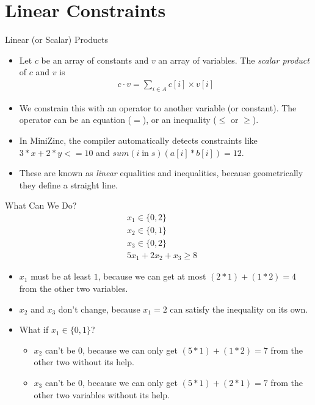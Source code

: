 \documentclass[aspectratio=169,compress,10pt]{beamer}
\begin{document}
\section{Linear Constraints}

\begin{frame}{Linear (or Scalar) Products}
    \begin{itemize}
        \item Let $c$ be an array of constants and $v$ an array of variables. The \emph{scalar
            product} of $c$ and $v$ is \begin{align*}
        c \cdot v = \sum_{i \in A}{c[i] \times v[i]}\end{align*}
        \item We constrain this with an operator to another variable (or constant). The operator can
            be an equation ($=$), or an inequality ($\le$ or $\ge$).
        \item In MiniZinc, the compiler automatically detects constraints like $3 * x + 2 * y <= 10$
            and $sum(i \operatorname{in} s)(a[i] * b[i]) = 12$.
        \item These are known as \emph{linear} equalities and inequalities, because
            geometrically they define a straight line.
    \end{itemize}
\end{frame}

\begin{frame}{What Can We Do?}
    \vspace*{-1em}
    \begin{align*}
        & x_1 \in \{ 0, 2 \} \\
        & x_2 \in \{ 0, 1 \} \\
        & x_3 \in \{ 0, 2 \} \\
        & 5x_1 + 2x_2 + x_3 \ge 8
    \end{align*}

    \begin{itemize}
        \item <2-> $x_1$ must be at least $1$, because we can get at most $(2 *
            1) + (1 * 2) = 4$ from the other two variables.
        \item <3-> $x_2$ and $x_3$ don't change, because $x_1 = 2$ can satisfy the inequality on its own.
        \item <4-> What if $x_1 \in \{ 0, 1 \}$?
            \begin{itemize}
            \item <5-> $x_2$ can't be $0$, because we can only get $(5 * 1) + (1 * 2) = 7$ from the other two
                without its help.
            \item <6-> $x_3$ can't be $0$, because we can only get $(5 * 1) + (2 * 1) = 7$ from the other two
                variables without its help.
            \end{itemize}
    \end{itemize}
\end{frame}
\end{document}
